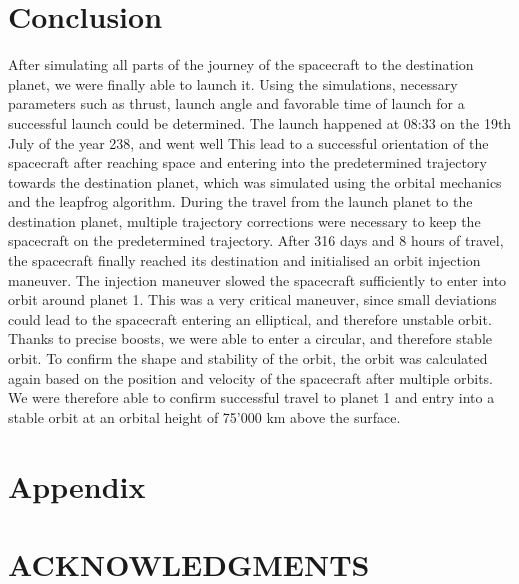 \documentclass[reprint,english,notitlepage]{revtex4-2}
\begin{document}
\section{Conclusion} \label{sec: conclusion}
    After simulating all parts of the journey of the spacecraft to the destination planet, we were finally able to launch it.
    Using the simulations, necessary parameters such as thrust, launch angle and favorable time of launch for a successful launch could be determined.
    The launch happened at 08:33 on the 19th July of the year 238, and went well
    This lead to a successful orientation of the spacecraft after reaching space and entering into the predetermined trajectory towards the destination planet, which was simulated using the orbital mechanics and the leapfrog algorithm.
    During the travel from the launch planet to the destination planet, multiple trajectory corrections were necessary to keep the spacecraft on the predetermined trajectory.
    After 316 days and 8 hours of travel, the spacecraft finally reached its destination and initialised an orbit injection maneuver.
    The injection maneuver slowed the spacecraft sufficiently to enter into orbit around planet 1.
    This was a very critical maneuver, since small deviations could lead to the spacecraft entering an elliptical, and therefore unstable orbit.
    Thanks to precise boosts, we were able to enter a circular, and therefore stable orbit.
    To confirm the shape and stability of the orbit, the orbit was calculated again based on the position and velocity of the spacecraft after multiple orbits.
    We were therefore able to confirm successful travel to planet 1 and entry into a stable orbit at an orbital height of 75'000 km above the surface.



\section{Appendix} \label{sec: appendix}

\section*{ACKNOWLEDGMENTS}

\newpage
\end{document}
